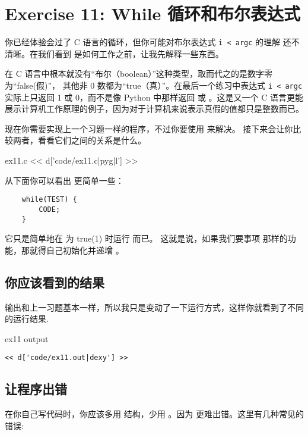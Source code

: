 \chapter{Exercise 11: While 循环和布尔表达式}

你已经体验会过了 C 语言的循环，但你可能对布尔表达式 \verb|i < argc| 的理解
还不清晰。在我们看到  是如何工作之前，让我先解释一些东西。

在 C 语言中根本就没有“布尔（boolean）”这种类型，取而代之的是数字零为“false(假)”，
其他非 0 数都为“true（真）”。在最后一个练习中表达式 \verb|i < argc| 实际上只返回 
1 或 0，而不是像 Python 中那样返回  或 。这是又一个 C 
语言更能展示计算机工作原理的例子，因为对于计算机来说表示真假的值都只是整数而已。

现在你需要实现上一个习题一样的程序，不过你要使用 来解决。 
接下来会让你比较两者，看看它们之间的关系是什么。

\begin{code}{ex11.c}
<< d['code/ex11.c|pyg|l'] >>
\end{code}

从下面你可以看出  更简单一些：

\begin{Verbatim}
    while(TEST) {
        CODE;
    }
\end{Verbatim}

它只是简单地在  为 true(1) 时运行 而已。
这就是说，如果我们要事项  那样的功能，那就得自己初始化并递增 。

\section{你应该看到的结果}

输出和上一习题基本一样，所以我只是变动了一下运行方式，这样你就看到了不同的运行结果.

\begin{code}{ex11 output}
\begin{lstlisting}
<< d['code/ex11.out|dexy'] >>
\end{lstlisting}
\end{code}

\section{让程序出错}

在你自己写代码时，你应该多用 结构，少用 。因为
 更难出错。这里有几种常见的错误:

